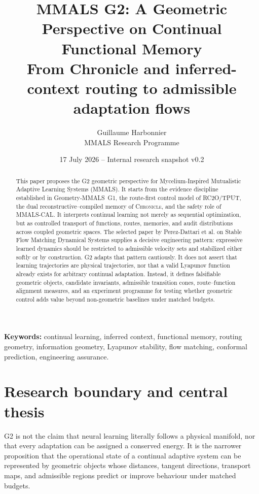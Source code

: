 \documentclass[11pt,a4paper]{article}
\title{\bfseries MMALS G2: A Geometric Perspective on Continual Functional Memory\\[0.4em]\large From Chronicle and inferred-context routing to admissible adaptation flows}
\author{Guillaume Harbonnier\\MMALS Research Programme}
\date{17 July 2026 -- Internal research snapshot v0.2}
\newcommand{\MMALS}{\textsc{MMALS}}
\newcommand{\Chronicle}{\textsc{Chronicle}}
\newcommand{\CAL}{\textsc{MMALS-CAL}}
\newcommand{\TPUT}{\textsc{TPUT}}
\newcommand{\RCtwoO}{\textsc{RC2O}}
\begin{document}
\maketitle
\begin{center}
\end{center}
\begin{abstract}
This paper proposes the G2 geometric perspective for Mycelium-Inspired Mutualistic Adaptive Learning Systems (\MMALS). It starts from the evidence discipline established in Geometry-\MMALS~G1, the route-first control model of \RCtwoO/\TPUT, the dual reconstructive--compiled memory of \Chronicle, and the safety role of \CAL. It interprets continual learning not merely as sequential optimization, but as controlled transport of functions, routes, memories, and audit distributions across coupled geometric spaces. The selected paper by Perez-Dattari et al. on Stable Flow Matching Dynamical Systems supplies a decisive engineering pattern: expressive learned dynamics should be restricted to admissible velocity sets and stabilized either softly or by construction. G2 adapts that pattern cautiously. It does not assert that learning trajectories are physical trajectories, nor that a valid Lyapunov function already exists for arbitrary continual adaptation. Instead, it defines falsifiable geometric objects, candidate invariants, admissible transition cones, route--function alignment measures, and an experiment programme for testing whether geometric control adds value beyond non-geometric baselines under matched budgets.
\end{abstract}
\textbf{Keywords:} continual learning, inferred context, functional memory, routing geometry, information geometry, Lyapunov stability, flow matching, conformal prediction, engineering assurance.
\tableofcontents
\newpage

\section{Research boundary and central thesis}
G2 is not the claim that neural learning literally follows a physical manifold, nor that every adaptation can be assigned a conserved energy. It is the narrower proposition that the operational state of a continual adaptive system can be represented by geometric objects whose distances, tangent directions, transport maps, and admissible regions predict or improve behaviour under matched budgets.
\end{document}
